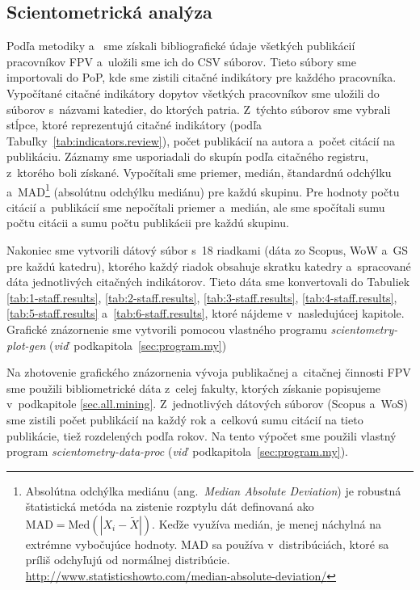 \subsection{Scientometrická analýza}

Podľa metodiky \citet{Kazakis2014a} a~\citet{Kazakis2014b,Kazakis2015} sme
získali bibliografické údaje všetkých publikácií pracovníkov FPV a~uložili sme
ich do CSV súborov.  Tieto súbory sme importovali do PoP, kde sme zistili
citačné indikátory pre každého pracovníka.  Vypočítané citačné indikátory
dopytov všetkých pracovníkov sme uložili do súborov s~názvami katedier, do
ktorých patria.  Z~týchto súborov sme vybrali stĺpce, ktoré reprezentujú citačné
indikátory (podľa Tabuľky~\ref{tab:indicators.review}), počet publikácií na
autora a~počet citácií na publikáciu.  Záznamy sme usporiadali do skupín podľa
citačného registru, z~ktorého boli získané.  Vypočítali sme priemer, medián,
štandardnú odchýlku a~MAD\footnote{Absolútna odchýlka mediánu
  (ang.~\emph{Median Absolute Deviation}) je robustná štatistická metóda na
  zistenie rozptylu dát definovaná ako $\mathrm{MAD} = \mathrm{Med}(|X_i - \tilde{X}|)$.
  Keďže využíva medián, je menej náchylná na extrémne vybočujúce hodnoty.
  MAD sa používa v~distribúciách, ktoré sa príliš odchyľujú od normálnej
  distribúcie.\\\url{http://www.statisticshowto.com/median-absolute-deviation/}}
(absolútnu odchýlku mediánu) pre každú skupinu.  Pre hodnoty počtu citácií
a~publikácií sme nepočítali priemer a~medián, ale sme spočítali sumu počtu citácii
a sumu počtu publikácii pre každú skupinu.

Nakoniec sme vytvorili dátový súbor s~18 riadkami (dáta zo Scopus, WoW a~GS pre
každú katedru), ktorého každý riadok obsahuje skratku katedry a~spracované dáta
jednotlivých citačných indikátorov.  Tieto dáta sme konvertovali do Tabuliek
\ref{tab:1-staff.results}, \ref{tab:2-staff.results}, \ref{tab:3-staff.results},
\ref{tab:4-staff.results}, \ref{tab:5-staff.results}
a~\ref{tab:6-staff.results}, ktoré nájdeme v~nasledujúcej kapitole.  Grafické
znázornenie sme vytvorili pomocou vlastného programu
\emph{scientometry-plot-gen} (\emph{viď}~podkapitola~\ref{sec:program.my})

Na zhotovenie grafického znázornenia vývoja publikačnej a~citačnej činnosti FPV
sme použili bibliometrické dáta z~celej fakulty, ktorých získanie popisujeme
v~podkapitole \ref{sec.all.mining}.  Z~jednotlivých dátových súborov (Scopus
a~WoS) sme zistili počet publikácií na každý rok a~celkovú sumu citácií na tieto
publikácie, tiež rozdelených podľa rokov.  Na tento výpočet sme použili vlastný
program \emph{scientometry-data-proc}
(\emph{viď}~podkapitola~\ref{sec:program.my}).

